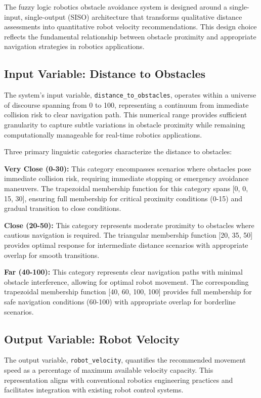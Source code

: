 \documentclass[11pt,a4paper]{article}
\begin{document}
The fuzzy logic robotics obstacle avoidance system is designed around a single-input, single-output (SISO) architecture that transforms qualitative distance assessments into quantitative robot velocity recommendations. This design choice reflects the fundamental relationship between obstacle proximity and appropriate navigation strategies in robotics applications.

\subsection{Input Variable: Distance to Obstacles}

The system's input variable, \texttt{distance\_to\_obstacles}, operates within a universe of discourse spanning from 0 to 100, representing a continuum from immediate collision risk to clear navigation path. This numerical range provides sufficient granularity to capture subtle variations in obstacle proximity while remaining computationally manageable for real-time robotics applications.

Three primary linguistic categories characterize the distance to obstacles:

\textbf{Very Close (0-30):} This category encompasses scenarios where obstacles pose immediate collision risk, requiring immediate stopping or emergency avoidance maneuvers. The trapezoidal membership function for this category spans [0, 0, 15, 30], ensuring full membership for critical proximity conditions (0-15) and gradual transition to close conditions.

\textbf{Close (20-50):} This category represents moderate proximity to obstacles where cautious navigation is required. The triangular membership function [20, 35, 50] provides optimal response for intermediate distance scenarios with appropriate overlap for smooth transitions.

\textbf{Far (40-100):} This category represents clear navigation paths with minimal obstacle interference, allowing for optimal robot movement. The corresponding trapezoidal membership function [40, 60, 100, 100] provides full membership for safe navigation conditions (60-100) with appropriate overlap for borderline scenarios.

\subsection{Output Variable: Robot Velocity}

The output variable, \texttt{robot\_velocity}, quantifies the recommended movement speed as a percentage of maximum available velocity capacity. This representation aligns with conventional robotics engineering practices and facilitates integration with existing robot control systems.
\end{document}
